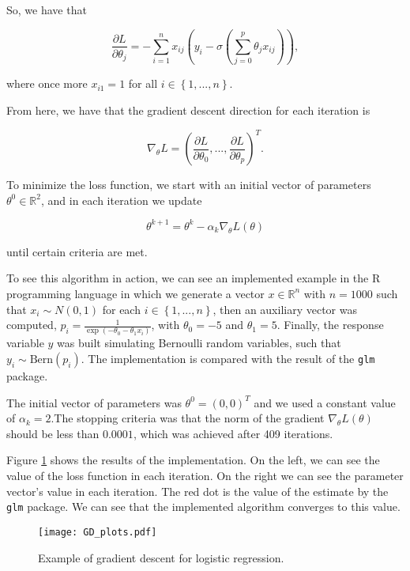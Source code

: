 So, we have that

$$
  \frac{\partial L}{\partial \theta_j} = - \sum_{i = 1}^n { x_{ij}(y_i - \sigma(\sum_{j=0}^{p}{\theta_j x_{ij}})) },
$$

where once more $x_{i1} = 1$ for all $i \in \left\{1, ..., n \right\}$.


From here, we have that the gradient descent direction for each iteration is

$$
  \nabla_{\theta} L = \left( \frac{\partial L}{\partial \theta_0}, ..., \frac{\partial L}{\partial \theta_p} \right)^T.
$$

To minimize the loss function, we start with an initial vector of parameters $\theta^0 \in \mathbb{R}^2$, and in each iteration we update

$$
  \theta^{k+1} = \theta^k - \alpha_k \nabla_{\theta} L(\theta)
$$

until certain criteria are met.

To see this algorithm in action, we can see an implemented example in the R programming language in which we generate a vector $x \in \mathbb{R}^n$ with $n = 1000$ such that $x_i \sim N(0, 1)$ for each $i \in \left\{1, ..., n \right\}$, then an auxiliary vector was computed, $p_i = \frac{1}{\exp \left( - \theta_0 - \theta_1 x_i \right)}$, with $\theta_0 = -5$ and $\theta_1 = 5$. Finally, the response variable $y$ was built simulating Bernoulli random variables, such that $y_i \sim \mathrm{Bern}(p_i)$.
The implementation is compared with the result of the \texttt{glm} package.

The initial vector of parameters was $\theta^0 = (0, 0)^T$ and we used a constant value of $\alpha_k = 2$.The stopping criteria was that the norm of the gradient $\nabla_{\theta} L(\theta)$ should be less than $0.0001$, which was achieved after 409 iterations.

Figure \ref{fig:GD_plots} shows the results of the implementation. On the left, we can see the value of the loss function in each iteration. On the right we can see the parameter vector's value in each iteration. The red dot is the value of the estimate by the \texttt{glm} package. We can see that the implemented algorithm converges to this value.

\begin{figure}[H]
    \centering
    \texttt{[image: GD\_plots.pdf]}
    \caption{Example of gradient descent for logistic regression.}
    \label{fig:GD_plots}
\end{figure}


